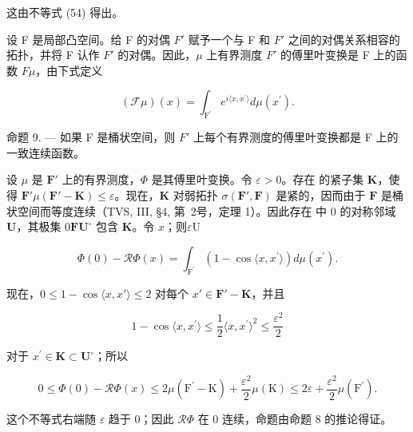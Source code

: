 这由不等式 (54) 得出。

设 F 是局部凸空间。给 F 的对偶 \(F'\) 赋予一个与 F 和 \(F'\) 之间的对偶关系相容的拓扑，并将 F 认作 \(F'\) 的对偶。因此，\(\mu\) 上有界测度 \(F'\) 的傅里叶变换是 F 上的函数 \(F\mu\)，由下式定义

\[
(\mathcal {F} \mu) (x) = \int_ {\mathrm{F} ^ {\prime}} e ^ {i \langle x, x ^ {\prime} \rangle} d \mu (x ^ {\prime}).
\]

命题 9. --- 如果 F 是桶状空间，则 \(F'\) 上每个有界测度的傅里叶变换都是 F 上的一致连续函数。

设 \(\mu\) 是 \(\mathbf{F}'\) 上的有界测度，\(\Phi\) 是其傅里叶变换。令 \(\varepsilon > 0\)。存在  的紧子集 \(\mathbf{K}\)，使得 \(\mathbf{F}'\)\(\mu(\mathbf{F}' - \mathbf{K}) \leqslant \varepsilon\)。现在，\(\mathbf{K}\) 对弱拓扑 \(\sigma(\mathbf{F}', \mathbf{F})\) 是紧的，因而由于 \(\mathbf{F}\) 是桶状空间而等度连续（TVS, III, §4, 第~2号，定理 1）。因此存在  中 0 的对称邻域 \(\mathbf{U}\)，其极集 \(0\)\(\mathbf{F}\)\(\mathbf{U}^{\circ}\) 包含 \(\mathbf{K}\)。令 \(x\)；则\(\varepsilon \mathrm{U}\)

\[
\Phi (0) - \mathcal {R} \Phi (x) = \int_ {\mathrm{F} ^ {\prime}} \left(1 - \cos \langle x, x ^ {\prime} \rangle\right) d \mu (x ^ {\prime}).
\]

现在，\(0 \leqslant 1 - \cos \langle x, x' \rangle \leqslant 2\) 对每个 \(x' \in \mathbf{F}' - \mathbf{K}\)，并且

\[
1 - \cos \langle x, x ^ {\prime} \rangle \leqslant \frac {1}{2} \langle x, x ^ {\prime} \rangle^ {2} \leqslant \frac {\varepsilon^ {2}}{2}
\]

对于 \(x^{\prime}\in \mathbf{K}\subset \mathbf{U}^{\circ}\)；所以

\[
0 \leqslant \Phi (0) - \mathcal {R} \Phi (x) \leqslant 2 \mu (\mathrm{F} ^ {\prime} - \mathrm{K}) + \frac {\varepsilon^ {2}}{2} \mu (\mathrm{K}) \leqslant 2 \varepsilon + \frac {\varepsilon^ {2}}{2} \mu (\mathrm{F} ^ {\prime}).
\]

这个不等式右端随 \(\varepsilon\) 趋于 0；因此 \(\mathcal{R}\Phi\) 在 0 连续，命题由命题 8 的推论得证。

